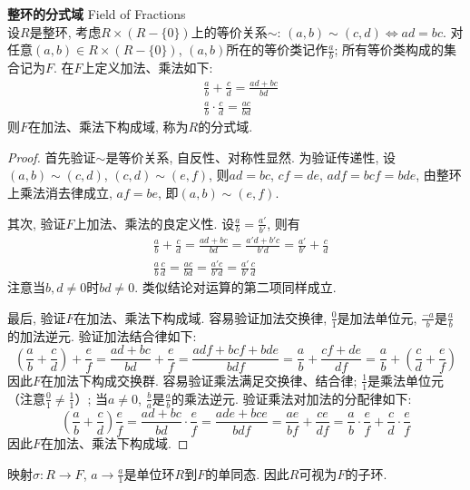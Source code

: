 \begin{pro} \textbf{整环的分式域} Field of Fractions \\
设$R$是整环, 考虑$R\times (R-\{0\})$上的等价关系$\sim$: $(a,b)\sim(c,d)\iff ad=bc$. 对任意$(a,b)\in R\times (R-\{0\})$, $(a,b)$所在的等价类记作$\frac{a}{b}$; 所有等价类构成的集合记为$F$. 在$F$上定义加法、乘法如下:
\begin{align}
    &\frac{a}{b}+\frac{c}{d} = \frac{ad+bc}{bd}\\
    &\frac{a}{b} \cdot \frac{c}{d} = \frac{ac}{bd}
\end{align}
则$F$在加法、乘法下构成域, 称为$R$的分式域. 
\end{pro}
\begin{proof}
首先验证$\sim$是等价关系, 自反性、对称性显然. 为验证传递性, 设$(a,b)\sim(c,d)$, $(c,d)\sim(e,f)$, 则$ad=bc$, $cf=de$, $adf=bcf=bde$, 由整环上乘法消去律成立, $af=be$, 即$(a,b)\sim(e,f)$. 
\par 其次, 验证$F$上加法、乘法的良定义性. 设$\frac{a}{b}=\frac{a'}{b'}$, 则有
\begin{align}
    &\frac{a}{b}+\frac{c}{d}=\frac{ad+bc}{bd}=\frac{a'd+b'c}{b'd}=\frac{a'}{b'}+\frac{c}{d}\\
    &\frac{a}{b}\frac{c}{d}=\frac{ac}{bd}=\frac{a'c}{b'd}=\frac{a'}{b'}\frac{c}{d}
\end{align}
注意当$b,d\neq 0$时$bd\neq 0$. 类似结论对运算的第二项同样成立. 
\par 最后, 验证$F$在加法、乘法下构成域. 容易验证加法交换律, $\frac{0}{1}$是加法单位元, $\frac{-a}{b}$是$\frac{a}{b}$的加法逆元. 验证加法结合律如下:
\begin{equation}
    \left(\frac{a}{b}+\frac{c}{d}\right)+\frac{e}{f}=\frac{ad+bc}{bd}+\frac{e}{f}=\frac{adf+bcf+bde}{bdf}=\frac{a}{b}+\frac{cf+de}{df}=\frac{a}{b}+\left(\frac{c}{d}+\frac{e}{f}\right)
\end{equation}
因此$F$在加法下构成交换群. 容易验证乘法满足交换律、结合律; $\frac{1}{1}$是乘法单位元（注意$\frac{0}{1}\neq \frac{1}{1}$）; 当$a\neq 0$, $\frac{b}{a}$是$\frac{a}{b}$的乘法逆元. 验证乘法对加法的分配律如下:
\begin{equation}
    \left(\frac{a}{b}+\frac{c}{d}\right)\frac{e}{f}=\frac{ad+bc}{bd}\cdot \frac{e}{f}=\frac{ade+bce}{bdf}=\frac{ae}{bf}+\frac{ce}{df}=\frac{a}{b}\cdot\frac{e}{f}+\frac{c}{d}\cdot\frac{e}{f}
\end{equation}
因此$F$在加法、乘法下构成域. 
\end{proof}

\par 映射$\sigma:R\to F$, $a\to \frac{a}{1}$是单位环$R$到$F$的单同态. 因此$R$可视为$F$的子环. 

